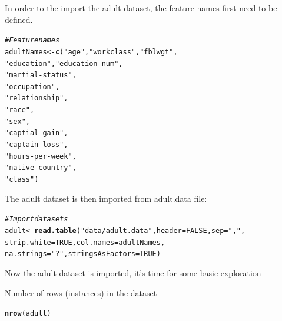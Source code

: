 \documentclass[10pt  ,usenames, dvipsnames]{article}\usepackage[]{graphicx}\usepackage[]{color}
\makeatletter
\newcommand{\hlnum}[1]{\textcolor[rgb]{0.686,0.059,0.569}{#1}}%
\newcommand{\hlstr}[1]{\textcolor[rgb]{0.192,0.494,0.8}{#1}}%
\newcommand{\hlcom}[1]{\textcolor[rgb]{0.678,0.584,0.686}{\textit{#1}}}%
\newcommand{\hlstd}[1]{\textcolor[rgb]{0.345,0.345,0.345}{#1}}%
\newcommand{\hlkwb}[1]{\textcolor[rgb]{0.69,0.353,0.396}{#1}}%
\newcommand{\hlkwc}[1]{\textcolor[rgb]{0.333,0.667,0.333}{#1}}%
\newcommand{\hlkwd}[1]{\textcolor[rgb]{0.737,0.353,0.396}{\textbf{#1}}}%
\newenvironment{kframe}{%
 \def\at@end@of@kframe{}%
 \ifinner\ifhmode%
  \def\at@end@of@kframe{\end{minipage}}%
  \begin{minipage}{\columnwidth}%
 \fi\fi%
 \def\FrameCommand##1{\hskip\@totalleftmargin \hskip-\fboxsep
 \colorbox{shadecolor}{##1}\hskip-\fboxsep
     \hskip-\linewidth \hskip-\@totalleftmargin \hskip\columnwidth}%
 \MakeFramed {\advance\hsize-\width
   \@totalleftmargin\z@ \linewidth\hsize
   \@setminipage}}%
 {\par\unskip\endMakeFramed%
 \at@end@of@kframe}
\newenvironment{knitrout}{}{} %
\makeatother
\begin{document}
\clearpage

In order to the import the adult dataset, the feature names first need to be defined.
\begin{knitrout}
\color{fgcolor}\begin{kframe}
\begin{alltt}
\hlcom{#Feature names}
\hlstd{adultNames} \hlkwb{<-} \hlkwd{c}\hlstd{(}\hlstr{"age"}\hlstd{,} \hlstr{"workclass"}\hlstd{,} \hlstr{"fblwgt"}\hlstd{,}
                \hlstr{"education"}\hlstd{,} \hlstr{"education-num"}\hlstd{,}
                \hlstr{"martial-status"}\hlstd{,}
                \hlstr{"occupation"}\hlstd{,}
                \hlstr{"relationship"}\hlstd{,}
                \hlstr{"race"}\hlstd{,}
                \hlstr{"sex"}\hlstd{,}
                \hlstr{"captial-gain"}\hlstd{,}
                \hlstr{"captain-loss"}\hlstd{,}
                \hlstr{"hours-per-week"}\hlstd{,}
                \hlstr{"native-country"}\hlstd{,}
                \hlstr{"class"}\hlstd{)}
\end{alltt}
\end{kframe}
\end{knitrout}



The adult dataset is then imported from adult.data file:
\begin{knitrout}
\color{fgcolor}\begin{kframe}
\begin{alltt}
\hlcom{#Import datasets}
\hlstd{adult} \hlkwb{<-} \hlkwd{read.table}\hlstd{(}\hlstr{"data/adult.data"} \hlstd{,}\hlkwc{header} \hlstd{=} \hlnum{FALSE}\hlstd{,} \hlkwc{sep} \hlstd{=} \hlstr{","}\hlstd{,}
                         \hlkwc{strip.white} \hlstd{=} \hlnum{TRUE}\hlstd{,} \hlkwc{col.names} \hlstd{= adultNames,}
                         \hlkwc{na.strings} \hlstd{=} \hlstr{"?"}\hlstd{,} \hlkwc{stringsAsFactors} \hlstd{=} \hlnum{TRUE}\hlstd{)}
\end{alltt}
\end{kframe}
\end{knitrout}




Now the adult dataset is imported, it's time for some basic exploration

Number of rows (instances) in the dataset

\begin{knitrout}
\color{fgcolor}\begin{kframe}
\begin{alltt}
\hlkwd{nrow}\hlstd{(adult)}
\end{alltt}
\end{kframe}
\end{knitrout}
\end{document}
